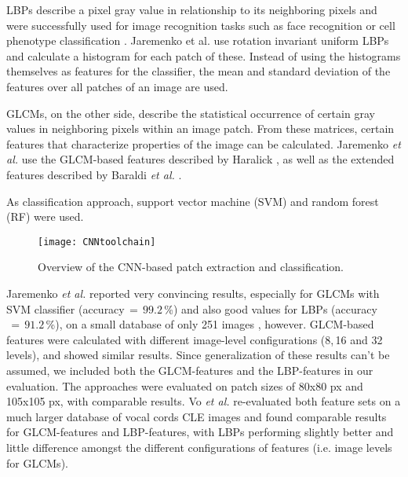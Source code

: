 \documentclass[fleqn,10pt]{wlscirep}
\begin{document}
LBPs describe a pixel gray value in
relationship to its neighboring pixels and were successfully used for
image recognition tasks such as face recognition \cite{Ahonen:2006gr}
 or cell phenotype classification \cite{Nanni:2010eb}. Jaremenko et
 al. use rotation invariant uniform LBPs and calculate a histogram for
 each patch of these. Instead of using the histograms themselves as
 features for the classifier, the mean and standard deviation of the
 features over all patches of an image are used.

GLCMs, on the other side, describe the statistical occurrence of
certain gray values in neighboring pixels within an image
patch. From these matrices, certain features that characterize properties of
the image can be calculated. Jaremenko \textit{et al.} use the GLCM-based
features described by Haralick
 \cite{Haralick:1973bs}, as
well as the extended features described by Baraldi \textit{et al.} %
\cite{Baraldi:1995js}.

As classification approach, support vector machine (SVM) and random
forest (RF) were used.


\begin{figure*}[!t]
\centering
\texttt{[image: CNNtoolchain]}
\hfil
\caption{Overview of the CNN-based patch extraction and classification.}
\label{CNNtoolchain}
\end{figure*}



Jaremenko \textit{et al.} reported very convincing results, especially for
GLCMs with SVM classifier
(accuracy$\,=\,99.2$\,\%) and also good values for
LBPs (accuracy$\,=\,91.2$\,\%), on a small database of only 251 images
\cite{Jaremenko:2015kh}, however. GLCM-based features were calculated with
different image-level configurations (8,\,16 and 32 levels), and showed
similar results. Since generalization of these results can't
be assumed, we included both the GLCM-features and the LBP-features in
our evaluation. The approaches were evaluated on patch sizes of 80x80 px and 105x105 px,
with comparable results. Vo \textit{et al.} re-evaluated both feature sets on a
much larger database of vocal cords CLE images \cite{Vo:2016} and
found comparable results for GLCM-features and LBP-features, with LBPs
performing slightly better and little difference amongst the different
configurations of features (i.e. image levels for GLCMs).
\end{document}
